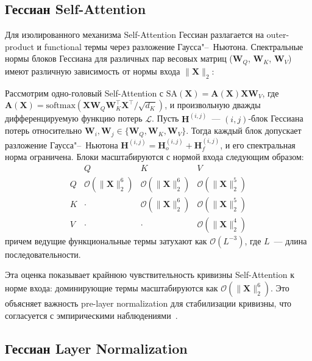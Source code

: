 \subsection{Гессиан Self-Attention}

Для изолированного механизма Self-Attention Гессиан разлагается на outer-product и functional термы через разложение Гаусса"--~Ньютона. Спектральные нормы блоков Гессиана для различных пар весовых матриц ($\mathbf{W}_Q$, $\mathbf{W}_K$, $\mathbf{W}_V$) имеют различную зависимость от нормы входа $\|\mathbf{X}\|_2$:

\begin{theorem}\label{th:sa-hessian}
Рассмотрим одно-головый Self-Attention с $\text{SA}(\mathbf{X}) = \mathbf{A}(\mathbf{X}) \mathbf{X} \mathbf{W}_V$, где $\mathbf{A}(\mathbf{X}) = \text{softmax}(\mathbf{X} \mathbf{W}_Q \mathbf{W}_K^\top \mathbf{X}^\top / \sqrt{d_K})$, и произвольную дважды дифференцируемую функцию потерь $\mathcal{L}$. Пусть $\mathbf{H}^{(i,j)}$~--- $(i,j)$-блок Гессиана потерь относительно $\mathbf{W}_i, \mathbf{W}_j \in \{\mathbf{W}_Q, \mathbf{W}_K, \mathbf{W}_V\}$. Тогда каждый блок допускает разложение Гаусса"--~Ньютона $\mathbf{H}^{(i,j)} = \mathbf{H}_o^{(i,j)} + \mathbf{H}_f^{(i,j)}$, и его спектральная норма ограничена. Блоки масштабируются с нормой входа следующим образом:
\begin{equation}
\begin{array}{c|ccc}
 & Q & K & V \\ \hline
Q & \mathcal{O}(\|\mathbf{X}\|_2^6) & \mathcal{O}(\|\mathbf{X}\|_2^6) & \mathcal{O}(\|\mathbf{X}\|_2^5) \\
K & \cdot & \mathcal{O}(\|\mathbf{X}\|_2^6) & \mathcal{O}(\|\mathbf{X}\|_2^5) \\
V & \cdot & \cdot & \mathcal{O}(\|\mathbf{X}\|_2^4)
\end{array}
\end{equation}
причем ведущие функциональные термы затухают как $\mathcal{O}(L^{-3})$, где $L$~--- длина последовательности.
\end{theorem}

Эта оценка показывает крайнюю чувствительность кривизны Self-Attention к норме входа: доминирующие термы масштабируются как $\mathcal{O}(\|\mathbf{X}\|_2^6)$. Это объясняет важность pre-layer normalization для стабилизации кривизны, что согласуется с эмпирическими наблюдениями~\cite{xiong2020layer}.

\subsection{Гессиан Layer Normalization}

